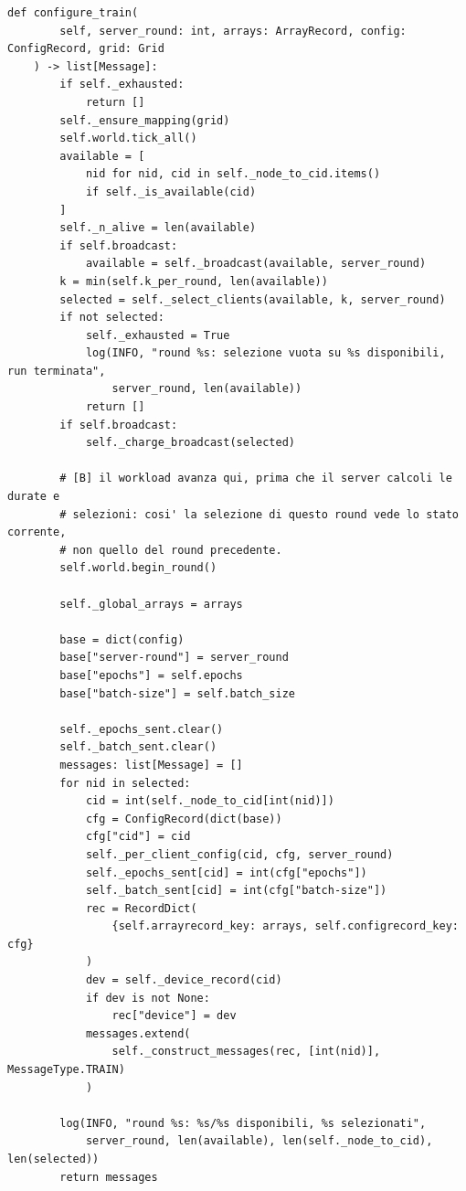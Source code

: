 \documentclass[11pt,a4paper]{article}
\begin{document}
\begin{lstlisting}[style=py,firstnumber=110,caption={\texttt{tesifl/strategies/fedavg.py}, lines 110--168}]
    def configure_train(
        self, server_round: int, arrays: ArrayRecord, config: ConfigRecord, grid: Grid
    ) -> list[Message]:
        if self._exhausted:
            return []
        self._ensure_mapping(grid)
        self.world.tick_all()
        available = [
            nid for nid, cid in self._node_to_cid.items()
            if self._is_available(cid)
        ]
        self._n_alive = len(available)
        if self.broadcast:
            available = self._broadcast(available, server_round)
        k = min(self.k_per_round, len(available))
        selected = self._select_clients(available, k, server_round)
        if not selected:
            self._exhausted = True
            log(INFO, "round %s: selezione vuota su %s disponibili, run terminata",
                server_round, len(available))
            return []
        if self.broadcast:
            self._charge_broadcast(selected)

        # [B] il workload avanza qui, prima che il server calcoli le durate e
        # selezioni: cosi' la selezione di questo round vede lo stato corrente,
        # non quello del round precedente.
        self.world.begin_round()

        self._global_arrays = arrays

        base = dict(config)
        base["server-round"] = server_round
        base["epochs"] = self.epochs
        base["batch-size"] = self.batch_size

        self._epochs_sent.clear()
        self._batch_sent.clear()
        messages: list[Message] = []
        for nid in selected:
            cid = int(self._node_to_cid[int(nid)])
            cfg = ConfigRecord(dict(base))
            cfg["cid"] = cid
            self._per_client_config(cid, cfg, server_round)
            self._epochs_sent[cid] = int(cfg["epochs"])
            self._batch_sent[cid] = int(cfg["batch-size"])
            rec = RecordDict(
                {self.arrayrecord_key: arrays, self.configrecord_key: cfg}
            )
            dev = self._device_record(cid)
            if dev is not None:
                rec["device"] = dev
            messages.extend(
                self._construct_messages(rec, [int(nid)], MessageType.TRAIN)
            )

        log(INFO, "round %s: %s/%s disponibili, %s selezionati",
            server_round, len(available), len(self._node_to_cid), len(selected))
        return messages
\end{lstlisting}
\end{document}
